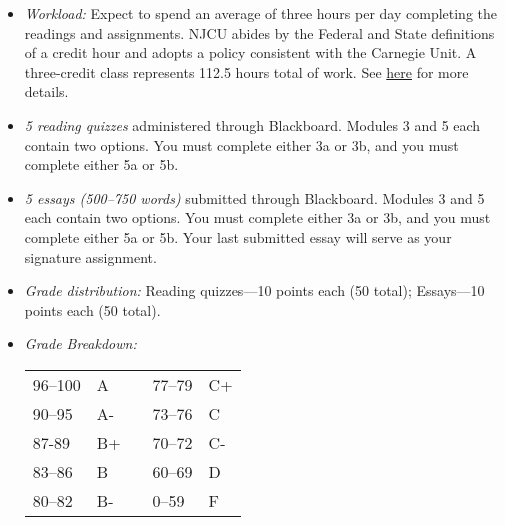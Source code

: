 \documentclass[article,oneside]{memoir}
\begin{document}
\begin{itemize}
\item \textit{Workload:} Expect to spend an average of three hours per day completing the readings and assignments. NJCU abides by the Federal and State definitions of a credit hour and adopts a policy consistent with the Carnegie Unit. A three-credit class represents 112.5 hours total of work. See \href{http://scottoconnor.org/resources/Credit.pdf}{here} for more details.


\item \textit{5 reading quizzes} administered through Blackboard. Modules 3 and 5 each contain two options. You must complete either 3a or 3b, and you must complete either 5a or 5b. %

\item \textit{5 essays (500--750 words)} submitted through Blackboard. Modules 3 and 5 each contain two options. You must complete either 3a or 3b, and you must complete either 5a or 5b. Your last submitted essay will serve as your signature assignment. %



  
\item \textit{Grade distribution:} Reading quizzes---10 points each (50 total);  Essays---10 points each (50 total).


\item \textit{Grade Breakdown:}

 \begin{tabular}{ | l | l | p{2cm} | l | l | }
    \hline 
96--100 & A  & &  77--79 &  C+ \\  
90--95 & A- & &  73--76 & C \\
87-89 & B+ &  &  70--72 & C- \\ 
83--86 & B  & &  60--69 & D\\
80--82 & B- & & 0--59 & F\\ \hline
    \end{tabular}


\end{itemize}
\end{document}
